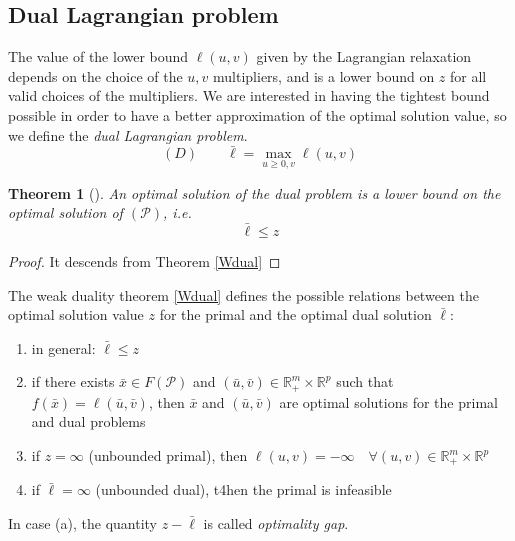 \documentclass{book}
\newcommand{\R}{\mathbb{R}}
\theoremstyle{theoremv2}
\newtheorem{theorem}{Theorem}[chapter]
\theoremstyle{defv2}
\theoremstyle{remark}
\theoremstyle{remark}
\begin{document}
\subsection{Dual Lagrangian problem}
The value of the lower bound $\ell(u,v)$ given by the Lagrangian relaxation depends on the choice of the $u,v$ multipliers, and is a lower bound on $z$ for all valid choices of the multipliers. We are interested in having the tightest bound possible in order to have a better approximation of the optimal solution value, so we define the \emph{dual Lagrangian problem}.
\[
    (D) \qquad \bar{\ell} = \max_{u\geq 0, v}\ell(u,v)
\]
\begin{theorem}[]
    An optimal solution of the dual problem is a lower bound on the optimal solution of $(\mathcal{P})$, i.e. 
    \[
        \bar{\ell}\leq z
    \]
\end{theorem}
\begin{proof}
    It descends from Theorem \ref{Wdual}
\end{proof}
The weak duality theorem \ref{Wdual} defines the possible relations between the optimal solution value $z$ for the primal and the optimal dual solution $\bar{\ell}$:
\begin{enumerate}[label=(\alph*)]
    \item in general: $\bar{\ell}\leq z$
    \item if there exists $\bar{x}\in F(\mathcal{P})$ and $(\bar{u},\bar{v})\in \R_+^m\times \R^p$ such that $f(\bar{x}) = \ell(\bar{u},\bar{v})$, then $\bar{x}$ and $(\bar{u},\bar{v})$ are optimal solutions for the primal and dual problems
    \item if $z=\infty$ (unbounded primal), then $\ell(u,v)=-\infty \quad \forall (u,v)\in\R^m_+\times \R^p$
    \item if $\bar{\ell}=\infty$ (unbounded dual), t4hen the primal is infeasible
\end{enumerate}
In case (a), the quantity $z-\bar{\ell}$ is called \emph{optimality gap}. 
\end{document}
